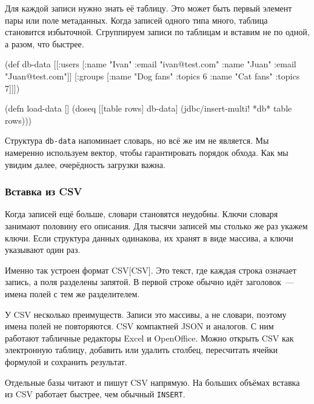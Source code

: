 Для каждой записи нужно знать её таблицу. Это может быть первый элемент пары
 или поле метаданных. Когда записей одного типа много,
таблица становится избыточной. Сгруппируем записи по таблицам и вставим не по
одной, а разом, что быстрее.


\begin{english}
  \begin{clojure}
(def db-data
  [[:users [{:name "Ivan" :email "ivan@test.com"}
            {:name "Juan" :email "Juan@test.com"}]]
   [:groups [{:name "Dog fans" :topics 6}
             {:name "Cat fans" :topics 7}]]])

(defn load-data []
  (doseq [[table rows] db-data]
    (jdbc/insert-multi! *db* table rows)))
  \end{clojure}
\end{english}

Структура \verb|db-data| напоминает словарь, но всё же им не является. Мы
намеренно используем вектор, чтобы гарантировать порядок обхода. Как мы увидим
далее, очерёдность загрузки важна.

\subsubsection*{Вставка из CSV}


Когда записей ещё больше, словари становятся неудобны. Ключи словаря занимают
половину его описания. Для тысячи записей мы столько же раз укажем ключи. Если
структура данных одинакова, их хранят в виде массива, а ключи указывают один
раз.

Именно так устроен формат CSV[CSV].
Это текст, где каждая строка означает запись, а поля разделены запятой.
В первой строке обычно идёт заголовок~--- имена полей с тем же разделителем.

У CSV несколько преимуществ. Записи это массивы, а не словари, поэтому имена
полей не повторяются. CSV компактней JSON и аналогов. С ним работают табличные
редакторы Excel и OpenOffice. Можно открыть CSV как электронную таблицу,
добавить или удалить столбец, пересчитать ячейки формулой и сохранить результат.


Отдельные базы читают и пишут CSV напрямую. На больших объёмах вставка из CSV
работает быстрее, чем обычный \verb|INSERT|.

